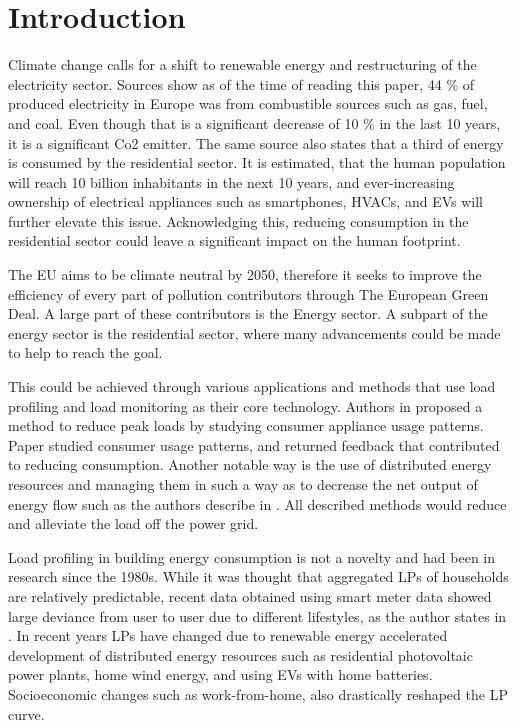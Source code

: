\chapter{Introduction}
\label{chapter1}

Climate change calls for a shift to renewable energy and restructuring of the electricity sector.
Sources \cite{eurostat2020} show as of the time of reading this paper, 44 \% of produced electricity in Europe was from combustible sources such as gas, fuel, and coal. Even 
though that is a significant decrease of 10 \% in the last 10 years, it is a significant Co2 emitter.
The same source \cite{eurostat2020} also states that a third of energy is consumed by the residential sector. It is estimated, 
that the human population will reach 10 billion inhabitants in the next 10 years, and ever-increasing ownership of electrical appliances such as smartphones, HVACs, and EVs will further elevate this issue.
Acknowledging this, reducing consumption in the residential sector could leave a significant impact on the human footprint. 


The EU aims to be climate neutral by 2050, therefore it seeks to improve the efficiency of every part of pollution contributors through The European Green Deal.
A large part of these contributors is the Energy sector.
A subpart of the energy sector is the residential sector, where many advancements could be made to help to reach the goal.  

This could be achieved through various applications and methods that use load profiling and load monitoring as their core technology.
Authors in \cite{Chuan2014} proposed a method to reduce peak loads by studying consumer
appliance usage patterns. Paper \cite{Csoknyai2019} studied consumer usage patterns, and returned feedback that contributed to reducing consumption.
Another notable way is the use of distributed energy resources and managing them in such a way as to decrease the net output of energy flow such as the authors describe in
\cite{MORENOJARAMILLO2021445}. All described methods would reduce and alleviate the load off the power grid.

Load profiling in building energy consumption is not a novelty and had been in research since the 1980s.
While it was thought that aggregated LPs of households are relatively predictable, recent data obtained using smart meter data showed large deviance from user to user due to different lifestyles, as the author states in \cite{Review2021}.
In recent years LPs have changed due to renewable energy accelerated development of distributed energy resources such as residential photovoltaic
power plants, home wind energy, and using EVs with home batteries. Socioeconomic changes such as work-from-home, also drastically reshaped the LP curve. 

